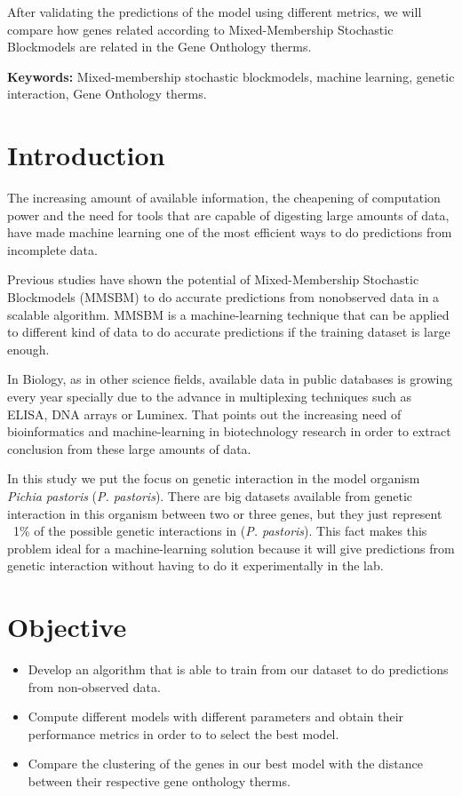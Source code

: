\documentclass[11pt]{article}
\begin{document}
\par
After validating the predictions of the model using different metrics, we will compare how genes related according to Mixed-Membership Stochastic Blockmodels are related in the Gene Onthology therms.

\par
\textbf{Keywords:} Mixed-membership stochastic blockmodels, machine learning, genetic interaction, Gene Onthology therms.


\section{Introduction}
The increasing amount of available information, the cheapening of computation power and the need for tools that are capable of digesting large amounts of data, have made machine learning one of the most efficient ways to do predictions from incomplete data.

\par 
Previous studies have shown the potential of Mixed-Membership Stochastic Blockmodels (MMSBM) to do accurate predictions from nonobserved data in a scalable algorithm. MMSBM is a machine-learning technique that can be applied to different kind of data to do accurate predictions if the training dataset is large enough. 

\par
In Biology, as in other science fields, available data in public databases is growing every year specially due to the advance in multiplexing techniques such as ELISA, DNA arrays or Luminex. That points out the increasing need of bioinformatics and machine-learning in biotechnology research in order to extract conclusion from these large amounts of data.

\par
In this study we put the focus on genetic interaction in the model organism \textit{Pichia pastoris} (\textit{P. pastoris}). There are big datasets available from genetic interaction in this organism between two or three genes, but they just represent ~1\% of the possible genetic interactions in (\textit{P. pastoris}). This fact makes this problem ideal for a machine-learning solution because it will give predictions from genetic interaction without having to do it experimentally in the lab. 

\section{Objective}
  \begin{itemize}
    \item Develop an algorithm that is able to train from our dataset to do predictions from non-observed data.
    \item Compute different models with different parameters and obtain their performance metrics in order to to select the best model.
    \item Compare the clustering of the genes in our best model with the distance between their respective gene onthology therms.
  \end{itemize}
\end{document}
